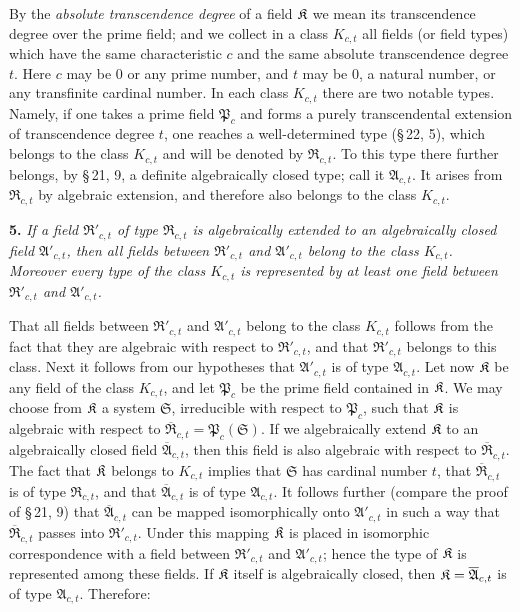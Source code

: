 By the \emph{absolute transcendence degree} of a field \(\mathfrak K\) we mean its transcendence degree over the prime field; and we collect in a class \(K_{c,t}\) all fields (or field types) which have the same characteristic \(c\) and the same absolute transcendence degree \(t\). Here \(c\) may be 0 or any prime number, and \(t\) may be 0, a natural number, or any transfinite cardinal number. In each class \(K_{c,t}\) there are two notable types. Namely, if one takes a prime field \(\mathfrak P_c\) and forms a purely transcendental extension of transcendence degree \(t\), one reaches a well-determined type (\S\,22, 5), which belongs to the class \(K_{c,t}\) and will be denoted by \(\mathfrak R_{c,t}\). To this type there further belongs, by \S\,21, 9, a definite algebraically closed type; call it \(\mathfrak A_{c,t}\). It arises from \(\mathfrak R_{c,t}\) by algebraic extension, and therefore also belongs to the class \(K_{c,t}\).

\textbf{5.} \emph{If a field \(\mathfrak R'_{c,t}\) of type \(\mathfrak R_{c,t}\) is algebraically extended to an algebraically closed field \(\mathfrak A'_{c,t}\), then all fields between \(\mathfrak R'_{c,t}\) and \(\mathfrak A'_{c,t}\) belong to the class \(K_{c,t}\). Moreover every type of the class \(K_{c,t}\) is represented by at least one field between \(\mathfrak R'_{c,t}\) and \(\mathfrak A'_{c,t}\).}

That all fields between \(\mathfrak R'_{c,t}\) and \(\mathfrak A'_{c,t}\) belong to the class \(K_{c,t}\) follows from the fact that they are algebraic with respect to \(\mathfrak R'_{c,t}\), and that \(\mathfrak R'_{c,t}\) belongs to this class. Next it follows from our hypotheses that \(\mathfrak A'_{c,t}\) is of type \(\mathfrak A_{c,t}\). Let now \(\mathfrak K\) be any field of the class \(K_{c,t}\), and let \(\mathfrak P_c\) be the prime field contained in \(\mathfrak K\). We may choose from \(\mathfrak K\) a system \(\mathfrak S\), irreducible with respect to \(\mathfrak P_c\), such that \(\mathfrak K\) is algebraic with respect to \(\overline{\mathfrak R}_{c,t}=\mathfrak P_c(\mathfrak S)\). If we algebraically extend \(\mathfrak K\) to an algebraically closed field \(\overline{\mathfrak A}_{c,t}\), then this field is also algebraic with respect to \(\overline{\mathfrak R}_{c,t}\). The fact that \(\mathfrak K\) belongs to \(K_{c,t}\) implies that \(\mathfrak S\) has cardinal number \(t\), that \(\overline{\mathfrak R}_{c,t}\) is of type \(\mathfrak R_{c,t}\), and that \(\overline{\mathfrak A}_{c,t}\) is of type \(\mathfrak A_{c,t}\). It follows further (compare the proof of \S\,21, 9) that \(\overline{\mathfrak A}_{c,t}\) can be mapped isomorphically onto \(\mathfrak A'_{c,t}\) in such a way that \(\overline{\mathfrak R}_{c,t}\) passes into \(\mathfrak R'_{c,t}\). Under this mapping \(\mathfrak K\) is placed in isomorphic correspondence with a field between \(\mathfrak R'_{c,t}\) and \(\mathfrak A'_{c,t}\); hence the type of \(\mathfrak K\) is represented among these fields. If \(\mathfrak K\) itself is algebraically closed, then \(\mathfrak K=\overline{\mathfrak A}_{c,t}\) is of type \(\mathfrak A_{c,t}\). Therefore:

